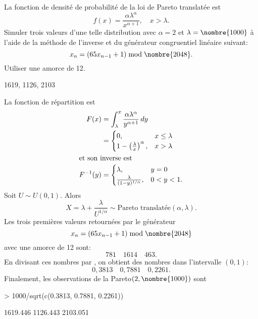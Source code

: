\begin{exercice}
  La fonction de densité de probabilité de la loi de
  Pareto translatée est
  \begin{displaymath}
    f(x) = \frac{\alpha \lambda^\alpha}{x^{\alpha + 1}}, \quad x > \lambda.
  \end{displaymath}
  Simuler trois valeurs d'une telle distribution avec $\alpha = 2$ et
  $\lambda = \nombre{1000}$ à l'aide de la méthode de l'inverse et du
  générateur congruentiel linéaire suivant:
  \begin{displaymath}
    x_n = (65 x_{n-1} + 1) \bmod \nombre{2048}.
  \end{displaymath}
  Utiliser une amorce de 12.
  \begin{rep}
    1619,
    1126,
    2103
  \end{rep}
  \begin{sol}
    La fonction de répartition est
    \begin{align*}
      F(x)
      &= \int_\lambda^x
      \frac{\alpha \lambda^\alpha}{y^{\alpha + 1}}\, dy \\
      &=
      \begin{cases}
        0, & x \leq \lambda \\
        1 - \left( \frac{\lambda}{x} \right)^\alpha, & x > \lambda
      \end{cases} \\
      \intertext{et son inverse est}
      F^{-1}(y)
      &=
      \begin{cases}
        \lambda, & y = 0 \\
        \frac{\lambda}{(1 - y)^{1/\alpha}}, & 0 < y < 1.
      \end{cases}
    \end{align*}
    Soit $U \sim U(0, 1)$. Alors
    \begin{displaymath}
      X = \lambda + \frac{\lambda}{U^{1/\alpha}} \sim
      \text{Pareto translatée}(\alpha, \lambda).
    \end{displaymath}
    Les trois premières valeurs retournées par le générateur
    \begin{displaymath}
      x_n = (65 x_{n-1} + 1) \bmod \nombre{2048}
    \end{displaymath}
    avec une amorce de 12 sont:
    \begin{displaymath}
      781 \quad 1614 \quad 463.
    \end{displaymath}
    En divisant ces nombres par , on obtient des nombres
    dans l'intervalle $(0, 1)$:
    \begin{displaymath}
      0,3813 \quad 0,7881 \quad 0,2261.
    \end{displaymath}
    Finalement, les observations de la Pareto$(2, \nombre{1000})$ sont
\begin{Schunk}
\begin{Sinput}
> 1000/sqrt(c(0.3813, 0.7881, 0.2261))
\end{Sinput}
\begin{Soutput}
[1] 1619.446 1126.443 2103.051
\end{Soutput}
\end{Schunk}
  \end{sol}
\end{exercice}

